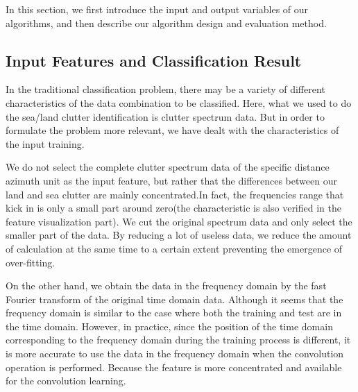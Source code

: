 In this section, we first introduce the input and output variables of our algorithms, and then describe our algorithm design and evaluation method.
\subsection{Input Features and Classification Result}
In the traditional classification problem, there may be a variety of different characteristics of the data combination to be classified. Here, what we used to do the sea/land clutter identification is clutter spectrum data. But in order to formulate the problem more relevant, we have dealt with the characteristics of the input training.

We do not select the complete clutter spectrum data of the specific distance azimuth unit as the input feature, but rather that the differences between our land and sea clutter are mainly concentrated.In fact, the frequencies range that kick in is only a small part around zero(the characteristic is also verified in the feature visualization part). We cut the original spectrum data and only select the smaller part of the data. By reducing a lot of useless data, we reduce the amount of calculation at the same time to a certain extent preventing the emergence of over-fitting.

On the other hand, we obtain the data in the frequency domain by the fast Fourier transform of the original time domain data. Although it seems that the frequency domain is similar to the case where both the training and test are in the time domain. However, in practice, since the position of the time domain corresponding to the frequency domain during the training process is different, it is more accurate to use the data in the frequency domain when the convolution operation is performed. Because the feature is more concentrated and available for the convolution learning.

